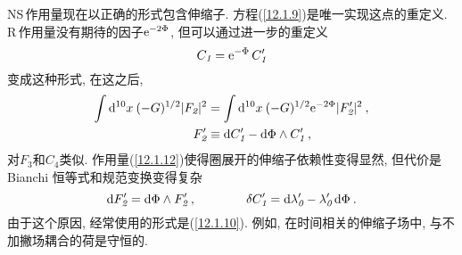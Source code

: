 NS\,作用量现在以正确的形式包含伸缩子. 方程(\ref{12.1.9})是唯一实现这点的重定义. R\,作用量没有期待的因子$ \mathrm{e}^{-2\Phi}$, 但可以通过进一步的重定义
\begin{equation}
    C_{\textit{1}} =\mathrm{e}^{-\Phi}\,C_{\textit{1}}^{\prime} \label{12.1.11}
\end{equation}
变成这种形式, 在这之后,
\begin{subequations} \label{12.1.12}
    \begin{align} 
        \int \mathrm{d}^{10}x\:(-G)^{1/2}\lvert F_{\textit{2}}\rvert^{2} &= \int \mathrm{d}^{10}x\: (-G)^{1/2}\mathrm{e}^{-2\Phi}\lvert F_{\textit{2}}^{\prime}\rvert^{2} \:, \label{12.1.12a} \\
        F_{\textit{2}}^{\prime} &\equiv \mathrm{d} C_{\textit{1}}^{\prime}-\mathrm{d}\Phi\wedge C_{\textit{1}}^{\prime} \:, \label{12.1.12b}
    \end{align}
\end{subequations}
对$ F_{\textit{3}} $和$ C_{\textit{4}} $类似. 作用量(\ref{12.1.12})使得圈展开的伸缩子依赖性变得显然, 但代价是 Bianchi 恒等式和规范变换变得复杂
\begin{equation}    
    \mathrm{d} F_{\textit{2}}^{\prime} = \mathrm{d} \Phi\wedge F_{\textit{2}}^{\prime}\:,\qquad\qquad 
    \delta C_{\textit{1}}^{\prime} =\mathrm{d} \lambda_{\textit{0}}^{\prime}- \lambda_{\textit{0}}^{\prime}\,\mathrm{d}\Phi \:. \label{12.1.13}
\end{equation}  
由于这个原因, 经常使用的形式是(\ref{12.1.10}). 例如, 在时间相关的伸缩子场中, 与不加撇场耦合的荷是守恒的.

